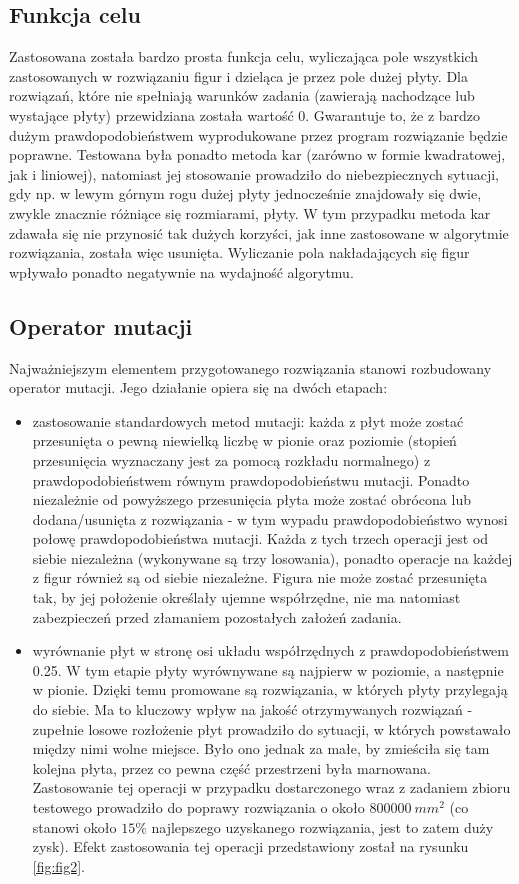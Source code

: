 \documentclass[11pt,a4paper,oneside]{article}
\begin{document}
\subsection{Funkcja celu}
Zastosowana została bardzo prosta funkcja celu, wyliczająca pole wszystkich zastosowanych w rozwiązaniu figur i dzieląca je przez pole dużej płyty. Dla rozwiązań, które nie spełniają warunków zadania (zawierają nachodzące lub wystające płyty) przewidziana została wartość 0. Gwarantuje to, że z bardzo dużym prawdopodobieństwem wyprodukowane przez program rozwiązanie będzie poprawne. Testowana była ponadto metoda kar (zarówno w formie kwadratowej, jak i liniowej), natomiast jej stosowanie prowadziło do niebezpiecznych sytuacji, gdy np. w lewym górnym rogu dużej płyty jednocześnie znajdowały się dwie, zwykle znacznie różniące się rozmiarami, płyty. W tym przypadku metoda kar zdawała się nie przynosić tak dużych korzyści, jak inne zastosowane w algorytmie rozwiązania, została więc usunięta. Wyliczanie pola nakładających się figur wpływało ponadto negatywnie na wydajność algorytmu.

\clearpage
\subsection{Operator mutacji}
Najważniejszym elementem przygotowanego rozwiązania stanowi rozbudowany operator mutacji. Jego działanie opiera się na dwóch etapach:
\begin{itemize}[noitemsep, topsep=0pt]
\item zastosowanie standardowych metod mutacji: każda z płyt może zostać przesunięta o pewną niewielką liczbę w pionie oraz poziomie (stopień przesunięcia wyznaczany jest za pomocą rozkładu normalnego) z prawdopodobieństwem równym prawdopodobieństwu mutacji. Ponadto niezależnie od powyższego przesunięcia płyta może zostać obrócona lub dodana/usunięta z rozwiązania - w tym wypadu prawdopodobieństwo wynosi połowę prawdopodobieństwa mutacji. Każda z tych trzech operacji jest od siebie niezależna (wykonywane są trzy losowania), ponadto operacje na każdej z figur również są od siebie niezależne. Figura nie może zostać przesunięta tak, by jej położenie określały ujemne współrzędne, nie ma natomiast zabezpieczeń przed złamaniem pozostałych założeń zadania.
\item wyrównanie płyt w stronę osi układu współrzędnych z prawdopodobieństwem 0.25. W tym etapie płyty wyrównywane są najpierw w poziomie, a następnie w pionie. Dzięki temu promowane są rozwiązania, w których płyty przylegają do siebie. Ma to kluczowy wpływ na jakość otrzymywanych rozwiązań - zupełnie losowe rozłożenie płyt prowadziło do sytuacji, w których powstawało między nimi wolne miejsce. Było ono jednak za małe, by zmieściła się tam kolejna płyta, przez co pewna część przestrzeni była marnowana. Zastosowanie tej operacji w przypadku dostarczonego wraz z zadaniem zbioru testowego prowadziło do poprawy rozwiązania o około $800 000~\si{mm^2}$ (co stanowi około $15\%$ najlepszego uzyskanego rozwiązania, jest to zatem duży zysk). Efekt zastosowania tej operacji przedstawiony został na rysunku \ref{fig:fig2}.
\end{itemize}
\end{document}
